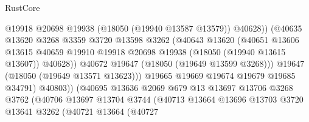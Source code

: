 \begin{lexlean}{RustCore}
\begin{coremodule}
                                        @19918
                                        @20698
                                        @19938
                                        (@18050 (@19940 @13587 @13579))
                                        @40628))
                                    (@40635
                                      @13620
                                      @3268
                                      @3359
                                      @3720
                                      @13598
                                      @3262
                                      (@40643
                                        @13620
                                        (@40651
                                          @13606
                                          @13615
                                          @40659
                                          @19910
                                          @19918
                                          @20698
                                          @19938
                                          (@18050 (@19940 @13615 @13607))
                                          @40628))
                                      @40672
                                      @19647
                                      (@18050 (@19649 @13599 @3268)))
                                    @19647
                                    (@18050 (@19649 @13571 @13623)))
                                  @19665
                                  @19669
                                  @19674
                                  @19679
                                  @19685
                                  @34791)
                                @40803))
                            (@40695
                              @13636
                              @2069
                              @679
                              @13
                              @13697
                              @13706
                              @3268
                              @3762
                              (@40706
                                @13697
                                @13704
                                @3744
                                (@40713
                                  @13664
                                  @13696
                                  @13703
                                  @3720
                                  @13641
                                  @3262
                                  (@40721
                                    @13664
                                    (@40727

\end{coremodule}
\end{lexlean}
